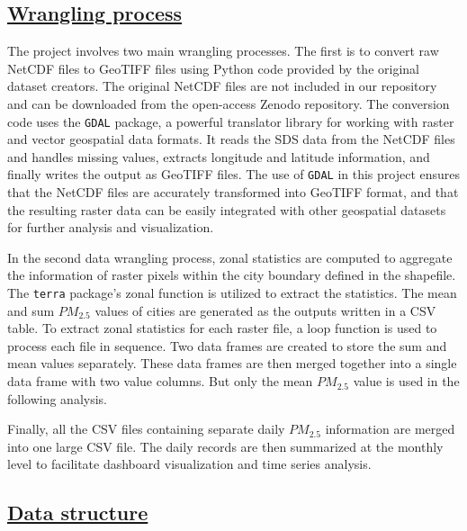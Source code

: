 \documentclass[
  12pt,
]{article}
\begin{document}
\hypertarget{wrangling-process}{%
\subsection{\texorpdfstring{\href{https://github.com/Artemis20123/FangLiRenZhang_ENV872_EDA_FinalProject/blob/main/Code/data\%20wrangling.Rmd}{Wrangling
process}}{Wrangling process}}\label{wrangling-process}}

The project involves two main wrangling processes. The first is to
convert raw NetCDF files to GeoTIFF files using Python code provided by
the original dataset creators. The original NetCDF files are not
included in our repository and can be downloaded from the open-access
Zenodo repository. The conversion code uses the \texttt{GDAL} package, a
powerful translator library for working with raster and vector
geospatial data formats. It reads the SDS data from the NetCDF files and
handles missing values, extracts longitude and latitude information, and
finally writes the output as GeoTIFF files. The use of \texttt{GDAL} in
this project ensures that the NetCDF files are accurately transformed
into GeoTIFF format, and that the resulting raster data can be easily
integrated with other geospatial datasets for further analysis and
visualization.

In the second data wrangling process, zonal statistics are computed to
aggregate the information of raster pixels within the city boundary
defined in the shapefile. The \texttt{terra} package's zonal function is
utilized to extract the statistics. The mean and sum \(PM_{2.5}\) values
of cities are generated as the outputs written in a CSV table. To
extract zonal statistics for each raster file, a loop function is used
to process each file in sequence. Two data frames are created to store
the sum and mean values separately. These data frames are then merged
together into a single data frame with two value columns. But only the
mean \(PM_{2.5}\) value is used in the following analysis.

Finally, all the CSV files containing separate daily \(PM_{2.5}\)
information are merged into one large CSV file. The daily records are
then summarized at the monthly level to facilitate dashboard
visualization and time series analysis.

\hypertarget{data-structure}{%
\subsection{\texorpdfstring{\href{https://github.com/Artemis20123/FangLiRenZhang_ENV872_EDA_FinalProject/blob/main/Data/Raw/Metadata.Rmd}{Data
structure}}{Data structure}}\label{data-structure}}
\end{document}
